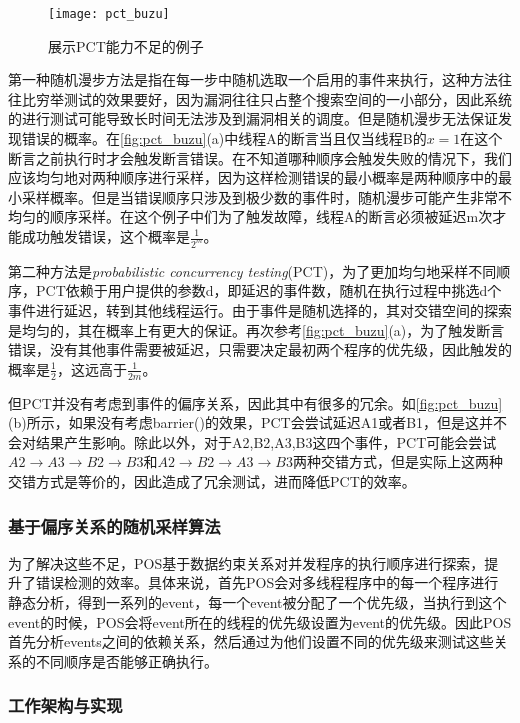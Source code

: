 \begin{figure}[ht]
    \centering
    \texttt{[image: pct\_buzu]}
    \caption{\label{fig:pct_buzu}展示PCT能力不足的例子\cite{yuan2018partial}}
\end{figure}

第一种随机漫步方法是指在每一步中随机选取一个启用的事件来执行，这种方法往往比穷举测试的效果要好，因为漏洞往往只占整个搜索空间的一小部分，因此系统的进行测试可能导致长时间无法涉及到漏洞相关的调度。但是随机漫步无法保证发现错误的概率。在\autoref{fig:pct_buzu}(a)中线程A的断言当且仅当线程B的$x = 1$在这个断言之前执行时才会触发断言错误。在不知道哪种顺序会触发失败的情况下，我们应该均匀地对两种顺序进行采样，因为这样检测错误的最小概率是两种顺序中的最小采样概率。但是当错误顺序只涉及到极少数的事件时，随机漫步可能产生非常不均匀的顺序采样。在这个例子中们为了触发故障，线程A的断言必须被延迟m次才能成功触发错误，这个概率是$\frac{1}{2^m}$。

第二种方法是\textit{probabilistic concurrency testing}(PCT)，为了更加均匀地采样不同顺序，PCT依赖于用户提供的参数d，即延迟的事件数，随机在执行过程中挑选d个事件进行延迟，转到其他线程运行。由于事件是随机选择的，其对交错空间的探索是均匀的，其在概率上有更大的保证。再次参考\autoref{fig:pct_buzu}(a)，为了触发断言错误，没有其他事件需要被延迟，只需要决定最初两个程序的优先级，因此触发的概率是$\frac{1}{2}$，这远高于$\frac{1}{2m}$。

但PCT并没有考虑到事件的偏序关系，因此其中有很多的冗余。如\autoref{fig:pct_buzu}(b)所示，如果没有考虑barrier()的效果，PCT会尝试延迟A1或者B1，但是这并不会对结果产生影响。除此以外，对于A2,B2,A3,B3这四个事件，PCT可能会尝试$A2 \rightarrow A3 \rightarrow B2 \rightarrow B3$和$A2 \rightarrow B2 \rightarrow A3 \rightarrow B3$两种交错方式，但是实际上这两种交错方式是等价的，因此造成了冗余测试，进而降低PCT的效率。

\subsubsection{基于偏序关系的随机采样算法}

为了解决这些不足，POS基于数据约束关系对并发程序的执行顺序进行探索，提升了错误检测的效率。具体来说，首先POS会对多线程程序中的每一个程序进行静态分析，得到一系列的event，每一个event被分配了一个优先级，当执行到这个event的时候，POS会将event所在的线程的优先级设置为event的优先级。因此POS首先分析events之间的依赖关系，然后通过为他们设置不同的优先级来测试这些关系的不同顺序是否能够正确执行。

\subsubsection{工作架构与实现}

